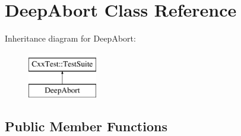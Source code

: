 \hypertarget{classDeepAbort}{\section{Deep\-Abort Class Reference}
\label{classDeepAbort}
}
Inheritance diagram for Deep\-Abort\-:\begin{figure}[H]
\begin{center}
\leavevmode
\includegraphics[height=2.000000cm]{classDeepAbort}
\end{center}
\end{figure}
\subsection*{Public Member Functions}
